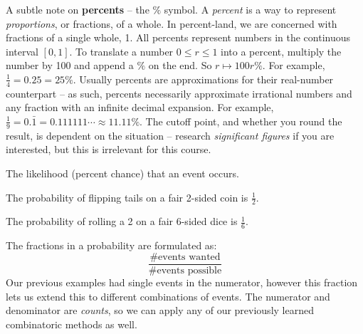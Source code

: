 \documentclass[main.tex]{subfiles}
\begin{document}
A subtle note on \textbf{percents} -- the \(\%\) symbol. A \textit{percent} is a way to represent \textit{proportions}, or fractions, of a whole. In percent-land, we are concerned with fractions of a single whole, 1. All percents represent numbers in the continuous interval \([0,1]\). To translate a number \(0 \leq r \leq 1\) into a percent, multiply the number by 100 and append a \(\%\) on the end. So \(r \mapsto 100r\%\). For example, \(\frac{1}{4} = 0.25 = 25\%\). Usually percents are approximations for their real-number counterpart -- as such, percents necessarily approximate irrational numbers and any fraction with an infinite decimal expansion. For example, \(\frac{1}{9} = 0.\bar{1} = 0.111111\cdots \approx 11.11\%\). The cutoff point, and whether you round the result, is dependent on the situation -- research \textit{significant figures} if you are interested, but this is irrelevant for this course.

\begin{defn}
	The likelihood (percent chance) that an event occurs.
\end{defn}

\begin{example}
	The probability of flipping tails on a fair 2-sided coin is \(\frac{1}{2}\).
\end{example}

\begin{example}
	The probability of rolling a 2 on a fair 6-sided dice is \(\frac{1}{6}\).
\end{example}

The fractions in a probability are formulated as: \[\frac{\text{\# events wanted}}{\text{\# events possible}}\]
Our previous examples had single events in the numerator, however this fraction lets us extend this to different combinations of events. The numerator and denominator are \textit{counts}, so we can apply any of our previously learned combinatoric methods as well.

\end{document}
